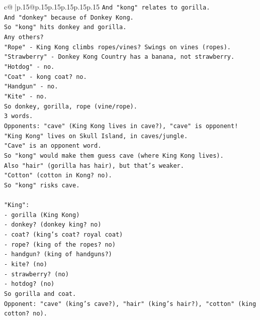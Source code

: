 \documentclass{article}
\begin{document}
{\begin{supertabular}{c@{$\;$}|p{.15\linewidth}@{}p{.15\linewidth}p{.15\linewidth}p{.15\linewidth}p{.15\linewidth}p{.15\linewidth}}
{{{\texttt{And "kong" relates to gorilla.} \\
\texttt{And "donkey" because of Donkey Kong.} \\
\texttt{So "kong" hits donkey and gorilla.} \\
\texttt{Any others?} \\
\texttt{"Rope" {-} King Kong climbs ropes/vines? Swings on vines (ropes).} \\
\texttt{"Strawberry" {-} Donkey Kong Country has a banana, not strawberry.} \\
\texttt{"Hotdog" {-} no.} \\
\texttt{"Coat" {-} kong coat? no.} \\
\texttt{"Handgun" {-} no.} \\
\texttt{"Kite" {-} no.} \\
\texttt{So donkey, gorilla, rope (vine/rope).} \\
\texttt{3 words.} \\
\texttt{Opponents: "cave" (King Kong lives in cave?), "cave" is opponent!} \\
\texttt{"King Kong" lives on Skull Island, in caves/jungle.} \\
\texttt{"Cave" is an opponent word.} \\
\texttt{So "kong" would make them guess cave (where King Kong lives).} \\
\texttt{Also "hair" (gorilla has hair), but that's weaker.} \\
\texttt{"Cotton" (cotton in Kong? no).} \\
\texttt{So "kong" risks cave.} \\
\\ 
\texttt{"King":} \\
\texttt{{-} gorilla (King Kong)} \\
\texttt{{-} donkey? (donkey king? no)} \\
\texttt{{-} coat? (king's coat? royal coat)} \\
\texttt{{-} rope? (king of the ropes? no)} \\
\texttt{{-} handgun? (king of handguns?)} \\
\texttt{{-} kite? (no)} \\
\texttt{{-} strawberry? (no)} \\
\texttt{{-} hotdog? (no)} \\
\texttt{So gorilla and coat.} \\
\texttt{Opponent: "cave" (king's cave?), "hair" (king's hair?), "cotton" (king cotton? no).} \\
}}}
\end{supertabular}}
\end{document}
